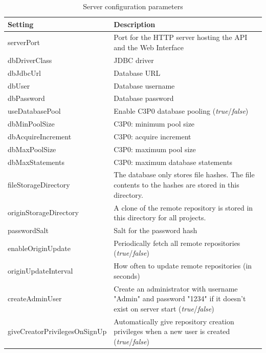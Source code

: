\begin{table}

    \scriptsize
    \begin{tabularx}{\textwidth}{ | l | X | }
    \hline
\textbf{Setting} & \textbf{Description} \\ \hline
serverPort & Port for the HTTP server hosting the API and the Web Interface \\ \hline
dbDriverClass & JDBC driver \\ \hline
dbJdbcUrl & Database URL \\ \hline
dbUser & Database username \\ \hline
dbPassword & Database password \\ \hline
useDatabasePool & Enable C3P0 database pooling (\emph{true}/\emph{false}) \\ \hline
dbMinPoolSize & C3P0: minimum pool size \\ \hline
dbAcquireIncrement & C3P0: acquire increment \\ \hline
dbMaxPoolSize & C3P0: maximum pool size \\ \hline
dbMaxStatements & C3P0: maximum database statements \\ \hline
fileStorageDirectory & The database only stores file hashes. The file contents to the hashes are stored in this directory. \\ \hline
originStorageDirectory & A clone of the remote repository is stored in this directory for all projects. \\ \hline
passwordSalt & Salt for the password hash \\ \hline
enableOriginUpdate & Periodically fetch all remote repositories (\emph{true}/\emph{false}) \\ \hline
originUpdateInterval & How often to update remote repositories (in seconds) \\ \hline
createAdminUser & Create an administrator with username "Admin" and password "1234" if it doesn't exist on server start (\emph{true}/\emph{false})  \\ \hline
giveCreatorPrivilegesOnSignUp & Automatically give repository creation privileges when a new user is created (\emph{true}/\emph{false})  \\ \hline
    \end{tabularx}
    
    \centering
    
  \caption{Server configuration parameters}
  \label{table:serverconfigtable}
  
    \end{table}
    



